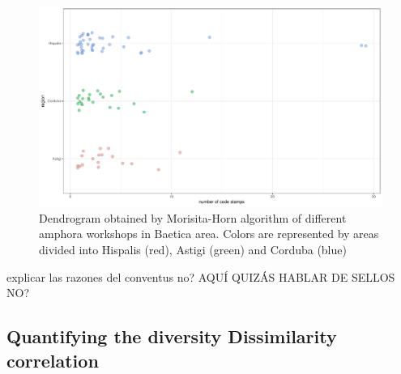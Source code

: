 \documentclass[review]{elsarticle}
\begin{document}
\begin{figure}[htp]
	\centering
\includegraphics[width=\linewidth]{figs/frequency}
\caption{Dendrogram obtained by Morisita-Horn algorithm of different amphora workshops in Baetica area. Colors are represented by areas divided into Hispalis (red), Astigi (green) and Corduba (blue)}
\label{frequency}
\end{figure} 

explicar las razones del conventus no?
AQUÍ QUIZÁS HABLAR DE SELLOS NO?




\subsection{Quantifying the diversity Dissimilarity correlation}

\end{document}

